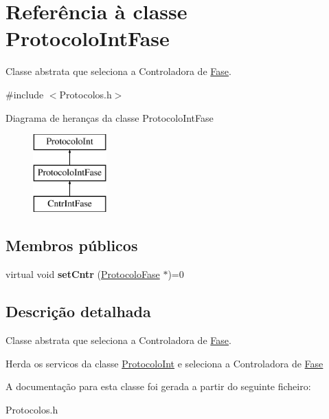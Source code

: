 \hypertarget{class_protocolo_int_fase}{
\section{\-Referência à classe \-Protocolo\-Int\-Fase}
\label{class_protocolo_int_fase}
}


\-Classe abstrata que seleciona a \-Controladora de \hyperlink{class_fase}{\-Fase}.  




{\ttfamily \#include $<$\-Protocolos.\-h$>$}

\-Diagrama de heranças da classe \-Protocolo\-Int\-Fase\begin{figure}[H]
\begin{center}
\leavevmode
\includegraphics[height=3.000000cm]{class_protocolo_int_fase}
\end{center}
\end{figure}
\subsection*{\-Membros públicos}
\begin{DoxyCompactItemize}
\item 
\hypertarget{class_protocolo_int_fase_a3895ab786d72b5294f8f3b64f0c607dc}{
virtual void {\bfseries set\-Cntr} (\hyperlink{class_protocolo_fase}{\-Protocolo\-Fase} $\ast$)=0}
\label{class_protocolo_int_fase_a3895ab786d72b5294f8f3b64f0c607dc}

\end{DoxyCompactItemize}


\subsection{\-Descrição detalhada}
\-Classe abstrata que seleciona a \-Controladora de \hyperlink{class_fase}{\-Fase}. 

\-Herda os servicos da classe \hyperlink{class_protocolo_int}{\-Protocolo\-Int} e seleciona a \-Controladora de \hyperlink{class_fase}{\-Fase} 

\-A documentação para esta classe foi gerada a partir do seguinte ficheiro\-:\begin{DoxyCompactItemize}
\item 
\-Protocolos.\-h\end{DoxyCompactItemize}
